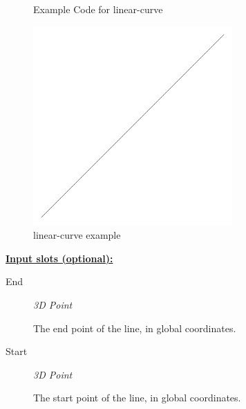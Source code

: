\documentclass [11pt]{book}
\begin{document}
\begin{itemize}
\begin{figure}
\begin{lrbox}{\boxedverb}
\begin{minipage}{\linewidth}
{\begin{verbatim}
\end{verbatim}}
\end{minipage}
\end{lrbox}
\fbox{\usebox{\boxedverb}}

\caption{Example Code for linear-curve}

\label{fig:example-code-linear-curve}

\end{figure}

\begin{figure}
\begin{center}
\includegraphics[width=3in,height=3in]{../images/example-linear-curve.pdf}
\end{center}

\caption{linear-curve example}

\label{fig:linear-curve}

\end{figure}





\textbf{
\underline{Input slots (optional):}}

\begin{description}

\item [End]
\emph{3D Point}

 The end point of the line, in global coordinates.




\item [Start]
\emph{3D Point}

 The start point of the line, in global coordinates.




\end{description}








\end{itemize}
\end{document}
